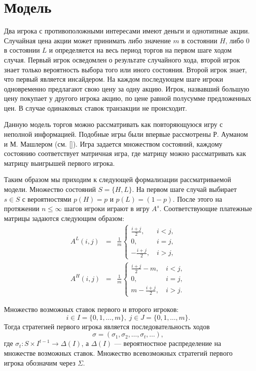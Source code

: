 \section{Модель}
Два игрока с противоположными интересами имеют деньги и однотипные акции. Случайная цена акции может принимать либо значение $ m $ в состоянии $ H $, либо $ 0 $ в состоянии $ L $ и определяется на весь период торгов на первом шаге ходом случая. Первый игрок осведомлен о результате случайного хода, второй игрок знает только вероятность выбора того или иного состояния. 
Второй игрок знает, что первый является инсайдером.
На каждом последующем шаге игроки одновременно предлагают свою цену за одну акцию. Игрок, назвавший большую цену покупает у другого игрока акцию, по цене равной полусумме предложенных цен. В случае одинаковых ставок транзакции не происходит.

Данную модель торгов можно рассматривать как повторяющуюся игру с неполной информацией. Подобные игры были впервые рассмотрены Р. Ауманом и М. Машлером (см. [\aumann]). Игра задается множеством состояний, каждому состоянию соответствует матричная игра, где матрицу можно рассматривать как матрицу выигрышей первого игрока.

Таким образом мы приходим к следующей формализации рассматриваемой модели.
Множество состояний $ S = \{H, L\} $. На первом шаге случай выбирает $ s \in S $ с вероятностями $ p(H) = p $ и $ p(L) = (1 - p) $.
После этого на протяжении $ n \leq \infty $ шагов игроки играют в игру $ A^s $.
Соответствующие платежные матрицы задаются следующим образом:
\begin{eqnarray*}
A^L(i, j) &=& \frac{1}{m}\begin{cases}
\frac{i+j}{2}, &\, i < j, \\
0, &\, i = j, \\
-\frac{i+j}{2}, &\, i > j,
\end{cases}
\\
A^H(i, j) &=& \frac{1}{m}\begin{cases}
\frac{i+j}{2} - m, &\, i < j, \\
0, &\, i = j, \\
m - \frac{i+j}{2}, &\, i > j.
\end{cases}
\end{eqnarray*}



Множество возможных ставок первого и второго игроков:
\[
  i \in I = \{0, 1, \ldots, m\}, \;
  j \in J = \{0, 1, \ldots, m\}.
\]
Тогда стратегией первого игрока является последовательность ходов
\[
  \sigma = (\sigma_1, \sigma_2, \ldots, \sigma_t, \ldots),
\]
где $ \sigma_t: S \times I^{t-1} \rightarrow \Delta(I) $, а $ \Delta(I) $ --- вероятностное распределение на множестве возможных ставок. Множество всевозможных стратегий первого игрока обозначим через $ \Sigma $.

